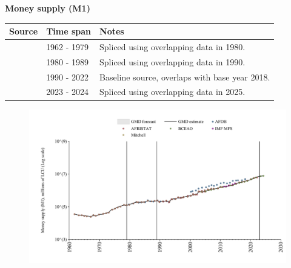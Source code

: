 \documentclass[12pt,a4paper,landscape]{article}
\begin{document}
\begin{adjustbox}{max totalsize={\paperwidth}{\paperheight},center}
\begin{minipage}[t][\textheight][t]{\textwidth}
\vspace*{0.5cm}
{}
\begin{center}
{\Large\bfseries Money supply (M1)}
\end{center}
\vspace{0.5cm}
\begin{table}[H]
\centering
\small
\begin{tabular}{|l|l|l|}
\hline
\textbf{Source} & \textbf{Time span} & \textbf{Notes} \\
\hline
\rowcolor{white}\cite{IMF_MFS}& 1962 - 1979 &Spliced using overlapping data in 1980. \\
\rowcolor{lightgray}\cite{AFDB}& 1980 - 1989 &Spliced using overlapping data in 1990. \\
\rowcolor{white}\cite{AFRISTAT}& 1990 - 2022 &Baseline source, overlaps with base year 2018. \\
\rowcolor{lightgray}\cite{BCEAO}& 2023 - 2024 &Spliced using overlapping data in 2025. \\
\hline
\end{tabular}
\end{table}
\begin{figure}[H]
\centering
\includegraphics[width=\textwidth,height=0.6\textheight,keepaspectratio]{graphs/SEN_M1.pdf}
\end{figure}
\end{minipage}
\end{adjustbox}
\end{document}
